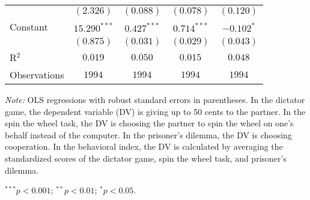 \begin{table}[!t]
\begin{center}
{\begin{threeparttable}
\begin{tabular}{l c c c c}
                            & $(2.326)$      & $(0.088)$      & $(0.078)$     & $(0.120)$      \\
Constant                    & $15.290^{***}$ & $0.427^{***}$  & $0.714^{***}$ & $-0.102^{*}$   \\
                            & $(0.875)$      & $(0.031)$      & $(0.029)$     & $(0.043)$      \\
\midrule
R$^2$                       & $0.019$        & $0.050$        & $0.015$       & $0.048$        \\
Observations                & $1994$         & $1994$         & $1994$        & $1994$         \\
\bottomrule
\end{tabular}
\begin{tablenotes}[flushleft]
\scriptsize{\item[\hspace{-5mm}] \textit{Note:} OLS regressions with robust standard errors in parentheses. 
                                In the dictator game, the dependent variable (DV) is giving up to 50 cents to the partner. 
                                In the spin the wheel task, the DV is choosing the partner to spin the wheel on one’s behalf instead of the computer. 
                                In the prisoner’s dilemma, the DV is choosing cooperation. 
                                In the behavioral index, the DV is calculated by averaging the standardized scores of the dictator game, spin the wheel task, and prisoner's dilemma. \item[\hspace{-5mm}] $^{***}p<0.001$; $^{**}p<0.01$; $^{*}p<0.05$.}
\end{tablenotes}
\end{threeparttable}
}
\label{tab:behavior_regression_counting}
\end{center}
\end{table}

\renewcommand{\baselinestretch}{1.67}%

